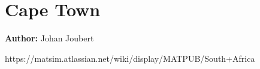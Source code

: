 \section{Cape Town}
\label{sec:capetown}
\hfill \textbf{Author:} Johan Joubert

https://matsim.atlassian.net/wiki/display/MATPUB/South+Africa

